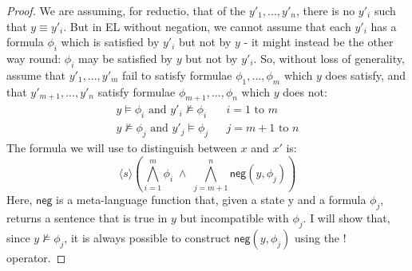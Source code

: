 \documentclass[smallextended]{svjour3}       %
\numberwithin{subcase}{mycase}
\begin{document}
\begin{proof}
We are assuming, for reductio, that of the $y'_1, ..., y'_n$, there is no $y'_i$ such that $y \equiv y'_i$.
But in EL without negation, we cannot assume that each $y'_i$ has a formula $\phi_i$ which is satisfied by $y'_i$ but not by $y$ - it might instead be the other way round: $\phi_i$ may be satisfied by $y$ but not by $y'_i$. So, without loss of generality, assume that $y'_1, ..., y'_m$ fail to satisfy formulae $\phi_1, ..., \phi_m$ which $y$ does satisfy, and that $y'_{m+1}, ..., y'_n$ satisfy formulae $\phi_{m+1}, ..., \phi_n$ which $y$ does not:
\begin{eqnarray}
y \models \phi_i \mbox{ and } y'_i \nvDash \phi_i & & i = 1 \mbox{ to } m \nonumber \\
y \nvDash \phi_j \mbox{ and } y'_j \models \phi_j & & j = m+1 \mbox{ to } n \nonumber
\end{eqnarray}
The formula we will use to distinguish between $x$ and $x'$ is:
\[
 \langle s \rangle ( \bigwedge_{i=1}^m \phi_i \; \land \; \bigwedge_{j=m+1}^n \mathsf{neg}(y, \phi_j))
 \]
 Here, $\mathsf{neg}$ is a meta-language function that, given a state y and a formula $\phi_j$, returns a sentence that is true in $y$ but incompatible with $\phi_j$. I will show that, since $y \nvDash \phi_j$, it is always possible to construct $ \mathsf{neg}(y, \phi_j)$ using the $!$ operator.


\end{proof}
\end{document}
